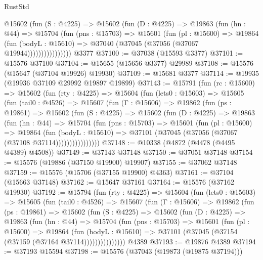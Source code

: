 \begin{lexlean}{RustStd}
\begin{coremodule}
                @15602
                  (fun (S : @4225) =>
                  @15602
                    (fun (D : @4225) =>
                    @19863
                      (fun (hn : @44) =>
                      @15704
                        (fun (pns : @15703) =>
                        @15601
                          (fun (pl : @15600) =>
                          @19864
                            (fun (bodyL : @15610) =>
                            @37040 (@37045 (@37056 (@37067 @19944))))))))))))))))
    @3377
@37100 := @37038 (@15593 @3377)
@37101 := @15576 @37100
@37104 := @15655 (@15656 @3377) @29989
@37108 := @15576 (@15647 (@37104 @19926) @19930)
@37109 := @15681 @3377
@37114 := @19935 (@19936 @37109 @29992 @19897 @19899)
@37143 := @15791
    (fun (rc : @15600) =>
    @15602
      (fun (rty : @4225) =>
      @15604
        (fun (lets0 : @15603) =>
        @15605
          (fun (tail0 : @4526) =>
          @15607
            (fun (Γ : @15606) =>
            @19862
              (fun (ps : @19861) =>
              @15602
                (fun (S : @4225) =>
                @15602
                  (fun (D : @4225) =>
                  @19863
                    (fun (hn : @44) =>
                    @15704
                      (fun (pns : @15703) =>
                      @15601
                        (fun (pl : @15600) =>
                        @19864
                          (fun (bodyL : @15610) =>
                          @37101 (@37045 (@37056 (@37067 (@37108 @37114))))))))))))))))
@37148 := @10338 (@4872 (@4478 (@4495 @4389) @4508))
@37149 := @37143 @37148
@37150 := @37051 @37148
@37154 := @15576 (@19886 (@37150 @19900) @19907)
@37155 := @37062 @37148
@37159 := @15576 (@15706 (@37155 @19900) @4363)
@37161 := @37104 (@15663 @37148)
@37162 := @15647 @37161
@37164 := @15576 (@37162 @19930)
@37192 := @15794
    (fun (rty : @4225) =>
    @15604
      (fun (lets0 : @15603) =>
      @15605
        (fun (tail0 : @4526) =>
        @15607
          (fun (Γ : @15606) =>
          @19862
            (fun (ps : @19861) =>
            @15602
              (fun (S : @4225) =>
              @15602
                (fun (D : @4225) =>
                @19863
                  (fun (hn : @44) =>
                  @15704
                    (fun (pns : @15703) =>
                    @15601
                      (fun (pl : @15600) =>
                      @19864
                        (fun (bodyL : @15610) =>
                        @37101 (@37045 (@37154 (@37159 (@37164 @37114)))))))))))))))
    @4389
@37193 := @19876 @4389
@37194 := @37193 @15594
@37198 := @15576 (@37043 (@19873 (@19875 @37194)))

\end{coremodule}
\end{lexlean}
